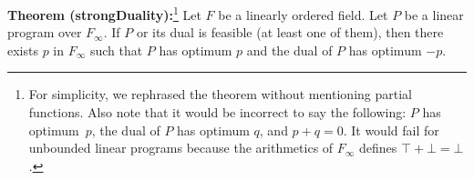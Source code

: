 \documentclass[]{article}
\renewcommand{\.}{\hskip .75pt}
\begin{document}
\medskip \noindent
\textbf{Theorem (strongDuality):}\footnote{For simplicity,
we rephrased the theorem without mentioning partial functions.
Also note that it would be incorrect to say the following:
$P$ has optimum~$p$, the dual of $P$ has optimum $q$, and $p + q = 0$.
It would fail for unbounded linear programs because the arithmetics
of $F_\infty$ defines $\top + \bot = \bot$.}
Let $F$ be a linearly ordered field.
Let $P$ be a linear program over $F_\infty$.
If $P$ or its dual is feasible (at least one of them),
then there exists $p$ in $F_\infty$ such that
$P$ has optimum $p$ and the dual of $P$ has optimum $-p$.
\end{document}
